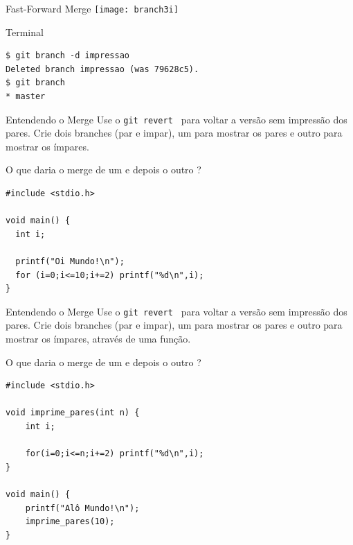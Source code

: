 \begin{frame}[fragile]{Fast-Forward Merge}
	\texttt{[image: branch3i]}
	\begin{terminal}{Terminal}
		\begin{Verbatim}[fontseries=b]
$ git branch -d impressao
Deleted branch impressao (was 79628c5).
$ git branch
* master
		\end{Verbatim}
	\end{terminal}
\end{frame}

\begin{frame}[fragile]{Entendendo o Merge}
	Use o \texttt{git revert } para voltar a versão sem impressão dos pares. Crie dois branches (par e impar), um para mostrar os pares e outro para mostrar os ímpares.
	
	O que daria o merge de um e depois o outro ?  

\begin{lstlisting}[style=cstyle]
#include <stdio.h>

void main() {
  int i;

  printf("Oi Mundo!\n");	
  for (i=0;i<=10;i+=2) printf("%d\n",i);
}

\end{lstlisting}
	
\end{frame}

\begin{frame}[fragile]{Entendendo o Merge}
	Use o \texttt{git revert } para voltar a versão sem impressão dos pares. Crie dois branches (par e impar), um para mostrar os pares e outro para mostrar os ímpares, através de uma função.
	
	O que daria o merge de um e depois o outro ?  
	
\begin{lstlisting}[style=cstyle]
#include <stdio.h>

void imprime_pares(int n) {
	int i;

	for(i=0;i<=n;i+=2) printf("%d\n",i); 
}

void main() {
	printf("Alô Mundo!\n");
	imprime_pares(10);
}
\end{lstlisting}
\end{frame}

